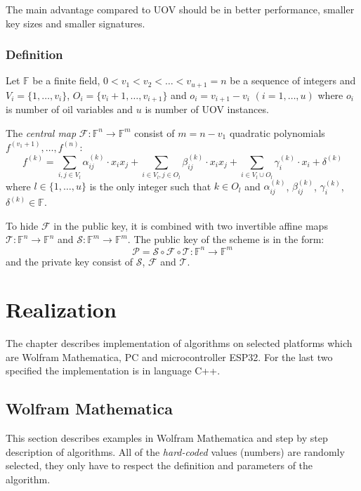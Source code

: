\documentclass[thesis=M,english]{FITthesis}[2019/12/23]
\begin{document}
\bigskip
\noindent
The main advantage compared to UOV should be in better performance, smaller key sizes and smaller signatures.

\subsection{Definition}\label{rb-definition}
Let $\mathbb{F}$ be a finite field, $0<v_1<v_2<\ldots<v_{u+1} = n$ be a sequence of integers and $V_i=\{1, \ldots, v_i\}$, $O_i=\{v_i+1, \ldots, v_{i+1}\}$ and $o_i = v_{i+1} - v_i \,\, (i=1,\ldots,u)$ where $o_i$ is number of oil variables and $u$ is number of UOV instances.

\bigskip
\noindent
The \textit{central map} $\mathcal{F}:\mathbb{F}^n \rightarrow \mathbb{F}^m$ consist of $m = n - v_1$ quadratic polynomials $f^{(v_1+1)}, \ldots, f^{(n)}$:
\[
	f^{(k)} = \sum\limits_{i,j \in V_l}{\alpha_{ij}^{(k)} \cdot x_ix_j} +  \sum\limits_{i \in V_l,j \in O_l}{\beta_{ij}^{(k)} \cdot x_ix_j}+ \sum\limits_{i \in V_l \cup O_l}{\gamma_{i}^{(k)} \cdot x_i} + \delta^{(k)}
\]
where $l \in \{1, \ldots, u\}$ is the only integer such that $k \in O_l$ and $\alpha_{ij}^{(k)}$, $\beta_{ij}^{(k)}$, $\gamma_{i}^{(k)}$, $\delta^{(k)} \in \mathbb{F}$.

\bigskip
\noindent
To hide $\mathcal{F}$ in the public key, it is combined with two invertible affine maps $\mathcal{T}: \mathbb{F}^n \rightarrow \mathbb{F}^n$ and $\mathcal{S}: \mathbb{F}^m \rightarrow \mathbb{F}^m$. The public key of the scheme is in the form:
\[
	\mathcal{P} = \mathcal{S} \circ \mathcal{F} \circ \mathcal{T} : \mathbb{F}^n \rightarrow \mathbb{F}^m
\]
and the private key consist of $\mathcal{S}$, $\mathcal{F}$ and $\mathcal{T}$.

\chapter{Realization}
The chapter describes implementation of algorithms on selected platforms which are Wolfram Mathematica, PC and microcontroller ESP32. For the last two specified the implementation is in language C++.

\section{Wolfram Mathematica}
This section describes examples in Wolfram Mathematica and step by step description of algorithms. All of the \textit{hard-coded} values (numbers) are randomly selected, they only have to respect the definition and parameters of the algorithm.  
\end{document}
